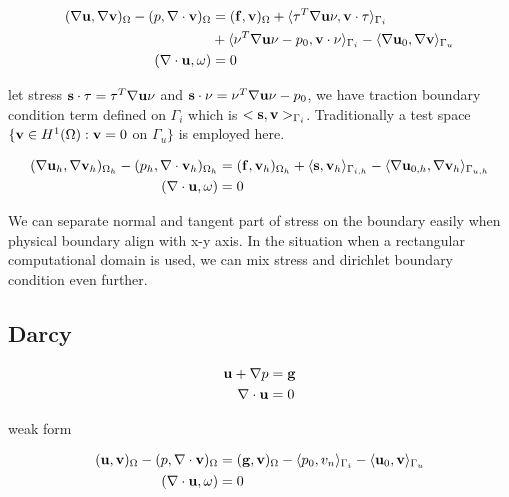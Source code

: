 \begin{equation}
\begin{aligned}
(\nabla \bold{u} , \nabla \bold{v})_{\Omega} - (p,\nabla \cdot \bold{v})_{\Omega} &= (\bold{f},\bold{v})_{\Omega} + 
\langle\tau^T \nabla \bold{u} \nu, \bold{v}\cdot \tau\rangle_{\Gamma_i}\\
&+ \langle\nu^T \nabla \bold{u} \nu - p_0, \bold{v}\cdot \nu\rangle_{\Gamma_i} - \langle\nabla \bold{u}_0, \nabla \bold{v}\rangle_{\Gamma_u}\\
(\nabla \cdot \bold{u}, \omega) &= 0
\end{aligned}
\end{equation}

let stress $\bold{s}\cdot \tau = \tau^T \nabla \bold{u} \nu $ and  $\bold{s} \cdot \nu =  \nu^T \nabla \bold{u} \nu - p_0$, 
we have traction boundary condition term defined on $\Gamma_i$ which is $<\bold{s},\bold{v}>_{\Gamma_i}$.
Traditionally a test space $\{ \bold{v} \in H^1(\Omega) : \bold{v} = 0$ on $\Gamma_u \}$ is employed here.

\begin{equation}
\begin{aligned}
(\nabla \bold{u}_h , \nabla \bold{v}_h)_{\Omega_h} - (p_h,\nabla \cdot \bold{v}_h)_{\Omega_h} &= (\bold{f},\bold{v}_h)_{\Omega_h} + 
		  \langle\bold{s}, \bold{v}_h\rangle_{\Gamma_{i,h}} - \langle\nabla \bold{u}_{0,h}, \nabla \bold{v}_h\rangle_{\Gamma_{u,h}}\\
(\nabla \cdot \bold{u}, \omega) &= 0
\end{aligned}
\end{equation}

We can separate normal and tangent part of stress on the boundary easily when physical boundary align with x-y axis.
In the situation when a rectangular computational domain is used, we can mix stress and dirichlet boundary condition
even further. 


\subsection{Darcy}
\begin{equation}
\begin{aligned}
\bold{u} + \nabla p & = \bold{g}\\
\nabla \cdot \bold{u} & = 0
\end{aligned}
\end{equation}

weak form

\begin{equation}
\begin{aligned}
(\bold{u}, \bold{v})_{\Omega} - (p, \nabla \cdot \bold{v})_{\Omega} &= (\bold{g},\bold{v})_{\Omega} 
- \langle p_0, v_n\rangle_{\Gamma_i} - \langle\bold{u}_0, \bold{v}\rangle_{\Gamma_u}\\
(\nabla \cdot \bold{u}, \omega) &= 0
\end{aligned}
\end{equation}


